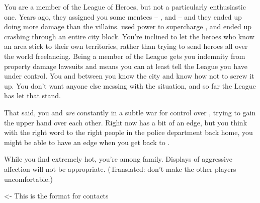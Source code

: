 \documentclass[char]{LRSguildcamp1}
\begin{document}
You are a member of the League of Heroes, but not a particularly enthusiastic one.  Years ago, they assigned you some mentees -- \cJuggernaut{}, and \cYS{} -- and they ended up doing more damage than the villains.  \cYS{} used \cYS{\their} power to supercharge \cJuggernaut{}, and \cJuggernaut{} ended up crashing through an entire city block.    You're inclined to let the heroes who know an area stick to their own territories, rather than trying to send heroes all over the world freelancing.  Being a member of the League gets you indemnity from property damage lawsuits and means you can at least tell the League you have \pCityO{} under control.  You and \cOldest{} between you know the city and know how not to screw it up.   You don't want anyone else messing with the situation, and so far the League has let that stand.

That said, you and \cOldest{} \emph{are} constantly in a subtle war for control over \pCityO{}, trying to gain the upper hand over each other.  Right now \cOldest{} has a bit of an edge, but you think with the right word to the right people in the police department back home, you might be able to have an edge when you get back to \pCityO{}.

\begin{itemz}[Goals]
	\item 
\end{itemz}

\begin{itemz}[Notes]
	\item While you find \cOS{} extremely hot, you're among family.  Displays of aggressive affection will not be appropriate.  (Translated: don't make the other players uncomfortable.)
\end{itemz}

\begin{contacts}
	\contact{} <- This is the format for contacts 
\end{contacts}
\end{document}
